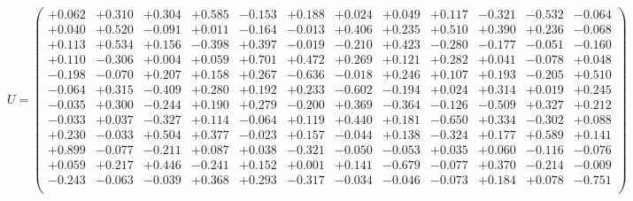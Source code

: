 \documentclass[9pt]{article}
\theoremstyle{plain}
\theoremstyle{definition}
\theoremstyle{remark}
\numberwithin{equation}{section}
\begin{document}
$U = \left(
\begin{array}{
cccccccccccc}
+0.062 & +0.310 & +0.304 & +0.585 & -0.153 & +0.188 & +0.024 & +0.049 & +0.117 & -0.321 & -0.532 & -0.064 \\
+0.040 & +0.520 & -0.091 & +0.011 & -0.164 & -0.013 & +0.406 & +0.235 & +0.510 & +0.390 & +0.236 & -0.068 \\
+0.113 & +0.534 & +0.156 & -0.398 & +0.397 & -0.019 & -0.210 & +0.423 & -0.280 & -0.177 & -0.051 & -0.160 \\
+0.110 & -0.306 & +0.004 & +0.059 & +0.701 & +0.472 & +0.269 & +0.121 & +0.282 & +0.041 & -0.078 & +0.048 \\
-0.198 & -0.070 & +0.207 & +0.158 & +0.267 & -0.636 & -0.018 & +0.246 & +0.107 & +0.193 & -0.205 & +0.510 \\
-0.064 & +0.315 & -0.409 & +0.280 & +0.192 & +0.233 & -0.602 & -0.194 & +0.024 & +0.314 & +0.019 & +0.245 \\
-0.035 & +0.300 & -0.244 & +0.190 & +0.279 & -0.200 & +0.369 & -0.364 & -0.126 & -0.509 & +0.327 & +0.212 \\
-0.033 & +0.037 & -0.327 & +0.114 & -0.064 & +0.119 & +0.440 & +0.181 & -0.650 & +0.334 & -0.302 & +0.088 \\
+0.230 & -0.033 & +0.504 & +0.377 & -0.023 & +0.157 & -0.044 & +0.138 & -0.324 & +0.177 & +0.589 & +0.141 \\
+0.899 & -0.077 & -0.211 & +0.087 & +0.038 & -0.321 & -0.050 & -0.053 & +0.035 & +0.060 & -0.116 & -0.076 \\
+0.059 & +0.217 & +0.446 & -0.241 & +0.152 & +0.001 & +0.141 & -0.679 & -0.077 & +0.370 & -0.214 & -0.009 \\
-0.243 & -0.063 & -0.039 & +0.368 & +0.293 & -0.317 & -0.034 & -0.046 & -0.073 & +0.184 & +0.078 & -0.751 \\
\end{array}
\right)$ \newline 
\end{document}
